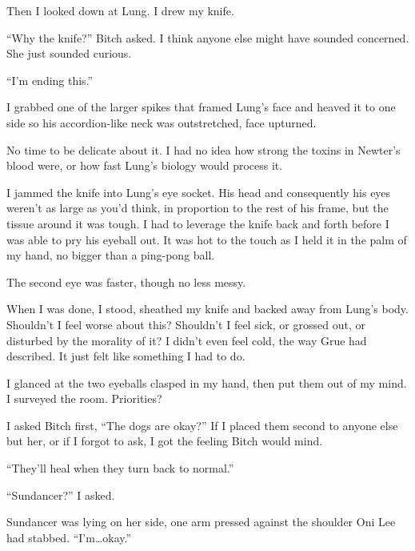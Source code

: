 Then I looked down at Lung.  I drew my knife.



``Why the knife?'' Bitch asked.  I think anyone else might have sounded concerned.  She just sounded curious.



``I'm ending this.''



I grabbed one of the larger spikes that framed Lung's face and heaved it to one side so his accordion-like neck was outstretched, face upturned.



No time to be delicate about it.  I had no idea how strong the toxins in Newter's blood were, or how fast Lung's biology would process it.



I jammed the knife into Lung's eye socket.  His head and consequently his eyes weren't as large as you'd think, in proportion to the rest of his frame, but the tissue around it was tough.  I had to leverage the knife back and forth before I was able to pry his eyeball out.  It was hot to the touch as I held it in the palm of my hand, no bigger than a ping-pong ball.



The second eye was faster, though no less messy.



When I was done, I stood, sheathed my knife and backed away from Lung's body. Shouldn't I feel worse about this?  Shouldn't I feel sick, or grossed out, or disturbed by the morality of it?  I didn't even feel cold, the way Grue had described.  It just felt like something I had to do.



I glanced at the two eyeballs clasped in my hand, then put them out of my mind.  I surveyed the room.  Priorities?



I asked Bitch first, ``The dogs are okay?''  If I placed them second to anyone else but her, or if I forgot to ask, I got the feeling Bitch would mind.



``They'll heal when they turn back to normal.''



``Sundancer?'' I asked.



Sundancer was lying on her side, one arm pressed against the shoulder Oni Lee had stabbed.  ``I'm\ldots okay.''



